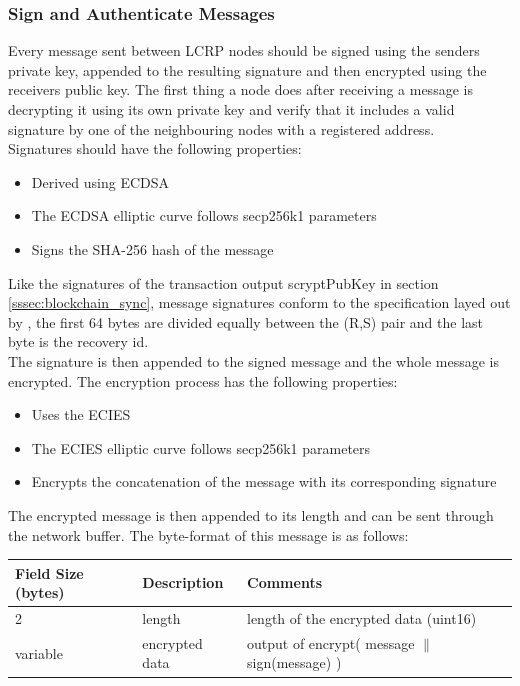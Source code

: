 \subsubsection{Sign and Authenticate Messages}

Every message sent between LCRP nodes should be signed using the senders private key, appended to the resulting signature and then encrypted using the receivers public key. The first thing a node does after receiving a message is decrypting it using its own private key and verify that it includes a valid signature by one of the neighbouring nodes with a registered address. \\
Signatures should have the following properties:

\begin{itemize}
  \item Derived using ECDSA
  \item The ECDSA elliptic curve follows secp256k1 parameters
  \item Signs the SHA-256 hash of the message
\end{itemize}

Like the signatures of the transaction output scryptPubKey in section \ref{sssec:blockchain_sync}, message signatures conform to the specification layed out by \cite{libsecp256k1}, the first 64 bytes are divided equally between the (R,S) pair and the last byte is the recovery id. \\
The signature is then appended to the signed message and the whole message is encrypted. The encryption process has the following properties:

\begin{itemize}
  \item Uses the ECIES
  \item The ECIES elliptic curve follows secp256k1 parameters
  \item Encrypts the concatenation of the message with its corresponding signature
\end{itemize}

The encrypted message is then appended to its length and can be sent through the network buffer. The byte-format of this message is as follows:

\begin{table}[H]
\begin{tabular}{|l|l|l|}
\hline
\rowcolor[HTML]{C0C0C0} 
Field Size (bytes) & Description & Comments                            \\ \hline
2 & length & length of the encrypted data (uint16) \\ \hline
variable & encrypted data & output of encrypt( message $\|$ sign(message) ) \\ \hline
\end{tabular}
\end{table}

